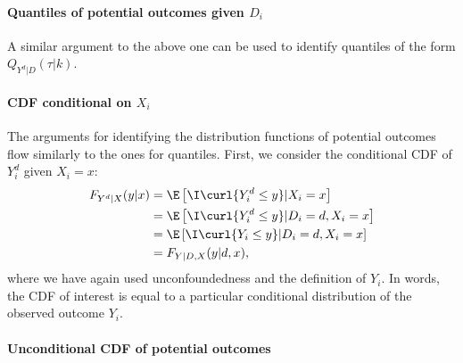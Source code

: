    \paragraph{Quantiles of potential outcomes given $D_i$}
   
   A similar argument to the above one can be used to identify quantiles of the form $Q_{Y^d|D}(\tau|k)$.
   
%   	   
%   	   
 
\paragraph{CDF conditional on $X_i$}

The arguments for identifying the distribution functions of potential outcomes flow similarly to the ones for quantiles.  First, we consider the conditional CDF of $Y^d_i$ given $X_i=x$:
\begin{align}
	F_{Y^d|X}(y|x) & =\E\left[\I\curl{Y^d_i\leq y}|X_i=x \right]\\
	& = \E\left[\I\curl{Y^d_i\leq y}|D_i=d, X_i=x \right]\\
	& = \E\left[ \I\curl{Y_i\leq y}|D_i=d, X_i=x   \right]\\
	& = F_{Y|D, X}(y|d, x),
\end{align}
where we have again used unconfoundedness and the definition of $Y_i$.
In words, the CDF of interest is equal to a particular conditional distribution of the observed outcome $Y_i$.

\paragraph{Unconditional CDF of potential outcomes}

